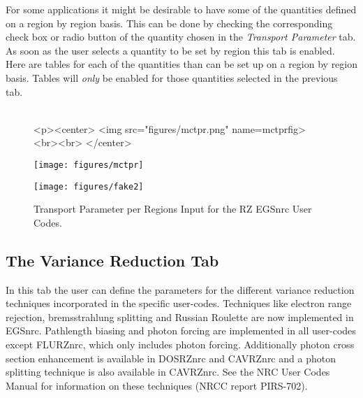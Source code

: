 \documentclass[12pt,twoside]{article}   %
\begin{document}
For some applications it might be desirable to have some of the quantities defined on a region by
region basis. This can be done by checking the corresponding check box or radio button of the quantity
chosen in the {\em Transport Parameter} tab. As soon as the user selects a quantity to be set by region
this tab is enabled. Here are tables for each of the quantities than can be set up on a region by region
basis. Tables will {\em only} be enabled for those quantities selected in the previous tab. \\ \\

\begin{figure}[htb]
\begin{htmlonly}
\begin{rawhtml}
<p><center>
<img src="figures/mctpr.png" name=mctprfig><br><br>
</center>
\end{rawhtml}
\end{htmlonly}
\begin{latexonly}
\begin{center}
\texttt{[image: figures/mctpr]}
\end{center}
\end{latexonly}
\begin{center}
\texttt{[image: figures/fake2]}
\end{center}
\caption{Transport Parameter per Regions Input for the RZ EGSnrc User Codes.}
\label{mctprfig}
\end{figure}

\newpage
\subsection{The Variance Reduction Tab}

In this tab the user can define the parameters for the different variance reduction techniques
incorporated in the specific user-codes. Techniques like electron range rejection,
bremsstrahlung splitting and Russian Roulette are now implemented in EGSnrc. Pathlength biasing and
photon forcing are implemented in all user-codes except FLURZnrc, which only includes photon
forcing. Additionally photon cross section enhancement is available in DOSRZnrc
and CAVRZnrc and a photon splitting technique is also available in CAVRZnrc.
See the NRC User Codes Manual for information on these techniques (NRCC report PIRS-702\cite{Ro10}).
\\ \\
\end{document}
